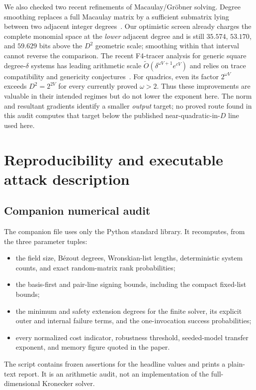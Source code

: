 \documentclass[11pt,a4paper]{article}
\theoremstyle{definition}
\theoremstyle{remark}
\begin{document}
We also checked two recent refinements of Macaulay/Gr\"obner solving.  Degree smoothing replaces a full Macaulay matrix by a sufficient submatrix lying between two adjacent integer degrees~\cite{DegreeSmoothing}.  Our optimistic screen already charges the complete monomial space at the \emph{lower} adjacent degree and is still $35.574$, $53.170$, and $59.629$ bits above the $D^2$ geometric scale; smoothing within that interval cannot reverse the comparison.  The recent F4-tracer analysis for generic square degree-$\delta$ systems has leading arithmetic scale $\widetilde O(\delta^{\omega V+1}e^{cV})$ and relies on trace compatibility and genericity conjectures~\cite{F4Tracer}.  For quadrics, even its factor $2^{\omega V}$ exceeds $D^2=2^{2V}$ for every currently proved $\omega>2$.  Thus these improvements are valuable in their intended regimes but do not lower the exponent here.  The norm and resultant gradients identify a smaller \emph{output} target; no proved route found in this audit computes that target below the published near-quadratic-in-$D$ line used here.

\section{Reproducibility and executable attack description}\label{app:algorithms}

\subsection{Companion numerical audit}

The companion file  uses only the Python standard library.  It recomputes, from the three parameter tuples:
\begin{itemize}
\item the field size, B\'ezout degrees, Wronskian-list lengths, deterministic system counts, and exact random-matrix rank probabilities;
\item the basis-first and pair-line signing bounds, including the compact fixed-list bounds;
\item the minimum and safety extension degrees for the finite solver, its explicit outer and internal failure terms, and the one-invocation success probabilities;
\item every normalized cost indicator, robustness threshold, seeded-model transfer exponent, and memory figure quoted in the paper.
\end{itemize}
The script contains frozen assertions for the headline values and prints a plain-text report.  It is an arithmetic audit, not an implementation of the full-dimensional Kronecker solver.
\end{document}
